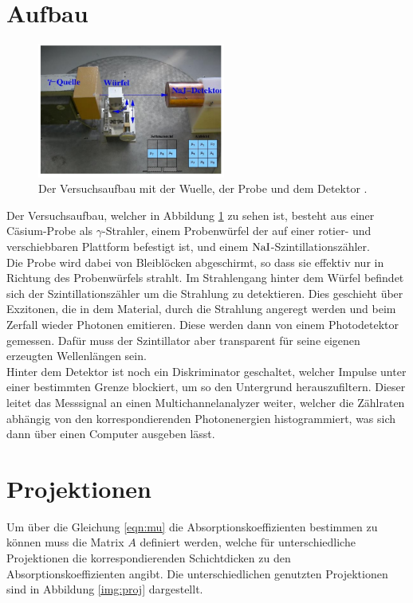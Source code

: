 \newpage
\section{Aufbau}

\begin{figure}[H]
    \centering
    \includegraphics[width=0.55\textwidth]{latex/images/aufbau.PNG}
    \caption{Der Versuchsaufbau mit der Wuelle, der Probe und dem Detektor \protect \cite{V14}.}
    \label{img:aufb}
\end{figure}

Der Versuchsaufbau, welcher in Abbildung \ref{img:aufb} zu sehen ist, besteht aus einer Cäsium-Probe als $\gamma$-Strahler, 
einem Probenwürfel der auf einer rotier- und verschiebbaren Plattform befestigt ist, und einem $\ce{NaI}$-Szintillationszähler.\\
Die Probe wird dabei von Bleiblöcken abgeschirmt, so dass sie effektiv nur in Richtung des Probenwürfels strahlt. 
Im Strahlengang hinter dem Würfel befindet sich der Szintillationszähler um die Strahlung zu detektieren. 
Dies geschieht über Exzitonen, die in dem Material, durch die Strahlung angeregt werden und beim Zerfall wieder Photonen emitieren. 
Diese werden dann von einem Photodetektor gemessen. Dafür muss der Szintillator aber transparent für seine eigenen erzeugten Wellenlängen sein.\\
Hinter dem Detektor ist noch ein Diskriminator geschaltet, welcher Impulse unter einer bestimmten Grenze blockiert, um so den Untergrund herauszufiltern.
Dieser leitet das Messsignal an einen Multichannelanalyzer weiter, welcher die Zählraten abhängig von den korrespondierenden Photonenergien histogrammiert, 
was sich dann über einen Computer ausgeben lässt.

\section{Projektionen}
\label{sec:proj}

\noindent
Um über die Gleichung \ref{eqn:mu} die Absorptionskoeffizienten bestimmen zu können muss die Matrix $A$ definiert werden, 
welche für unterschiedliche  Projektionen die korrespondierenden Schichtdicken zu den Absorptionskoeffizienten angibt. 
Die unterschiedlichen genutzten Projektionen sind in Abbildung \ref{img:proj} dargestellt.

